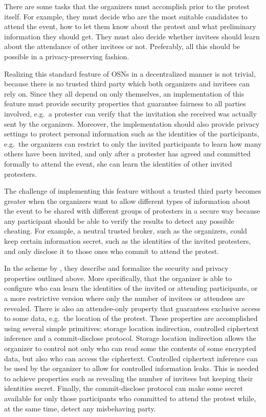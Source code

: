 There are some tasks that the organizers must accomplish prior to the protest 
itself.
For example, they must decide who are the most suitable candidates to attend 
the event, how to let them know about the protest and what preliminary 
information they should get.
They must also decide whether invitees should learn about the attendance of 
other invitees or not.
Preferably, all this should be possible in a privacy-preserving fashion.

Realizing this standard feature of \acp{OSN} in a decentralized manner is not 
trivial, because there is no trusted third party which both organizers and 
invitees can rely on.
Since they all depend on only themselves, an implementation of this feature 
must provide security properties that guarantee fairness to all parties 
involved, e.g.\  a protester can verify that the invitation she received was 
actually sent by the organizers.
Moreover, the implementation should also provide privacy settings to protect 
personal information such as the identities of the participants, e.g.\ the 
organizers can restrict to only the invited participants to learn how many 
others have been invited, and only after a protester has agreed and committed 
formally to attend the event, she can learn the identities of other invited 
protesters.

The challenge of implementing this feature without a trusted third party 
becomes greater when the organizers want to allow different types of 
information about the event to be shared with different groups of protesters in 
a secure way because any participant should be able to verify the results to 
detect any possible cheating.
For example, a neutral trusted broker, such as the organizers, could keep 
certain information secret, such as the identities of the invited protesters, 
and only disclose it to those ones who commit to attend the protest. 

In the scheme by \citet{EventsInvitations}, they describe and formalize the 
security and privacy properties outlined above.
More specifically, that the organizer is able to configure who can learn the 
identities of the invited or attending participants, or a more restrictive 
version where only the number of invitees or attendees are revealed.
There is also an attendee-only property that guarantees exclusive access to 
some data, e.g.\ the location of the protest.
These properties are accomplished using several simple primitives:
storage location indirection, controlled ciphertext inference and 
a commit-disclose protocol.
Storage location indirection allows the organizer to control not only who can 
read some the contents of some encrypted data, but also who can access the 
ciphertext.
Controlled ciphertext inference can be used by the organizer to allow for 
controlled information leaks.
This is needed to achieve properties such as revealing the number of invitees 
but keeping their identities secret.
Finally, the commit-disclose protocol can make some secret available for only 
those participants who committed to attend the protest while, at the same time, 
detect any misbehaving party.

